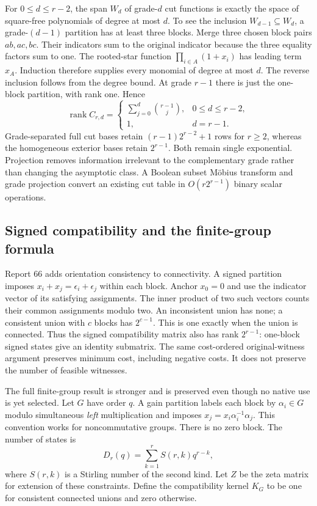 For $0\le d\le r-2$, the span $W_d$ of grade-$d$ cut functions is exactly
the space of square-free polynomials of degree at most $d$. To see the
inclusion $W_{d-1}\subseteq W_d$, a grade-$(d-1)$ partition has at least
three blocks. Merge three chosen block pairs $ab,ac,bc$. Their indicators
sum to the original indicator because the three equality factors sum to one.
The rooted-star function $\prod_{i\in A}(1+x_i)$ has leading term $x_A$.
Induction therefore supplies every monomial of degree at most $d$. The
reverse inclusion follows from the degree bound. At grade $r-1$ there is
just the one-block partition, with rank one. Hence
\[
 \operatorname{rank} C_{r,d}=
 \begin{cases}\sum_{j=0}^d\binom{r-1}{j},&0\le d\le r-2,\\
 1,&d=r-1.
 \end{cases}
\]
Grade-separated full cut bases retain $(r-1)2^{r-2}+1$ rows for $r\ge2$,
whereas the homogeneous exterior bases retain $2^{r-1}$. Both remain single
exponential. Projection removes information irrelevant to the complementary
grade rather than changing the asymptotic class. A Boolean subset M\"obius
transform and grade projection convert an existing cut table in
$O(r2^{r-1})$ binary scalar operations.

\subsection{Signed compatibility and the finite-group formula}

Report 66 adds orientation consistency to connectivity. A signed partition
imposes $x_i+x_j=\epsilon_i+\epsilon_j$ within each block. Anchor $x_0=0$
and use the indicator vector of its satisfying assignments. The inner
product of two such vectors counts their common assignments modulo two.
An inconsistent union has none; a consistent union with $c$ blocks has
$2^{c-1}$. This is one exactly when the union is connected. Thus the signed
compatibility matrix also has rank $2^{r-1}$: one-block signed states give
an identity submatrix. The same cost-ordered original-witness argument
preserves minimum cost, including negative costs. It does not preserve the
number of feasible witnesses.

The full finite-group result is stronger and is preserved even though no
native use is yet selected. Let $G$ have order $q$. A gain partition labels
each block by $\alpha_i\in G$ modulo simultaneous \emph{left} multiplication
and imposes $x_j=x_i\alpha_i^{-1}\alpha_j$. This convention works for
noncommutative groups. There is no zero block. The number of states is
\[
 D_r(q)=\sum_{k=1}^r S(r,k)q^{r-k},
\]
where $S(r,k)$ is a Stirling number of the second kind. Let $Z$ be the zeta
matrix for extension of these constraints. Define the compatibility kernel
$K_G$ to be one for consistent connected unions and zero otherwise.

